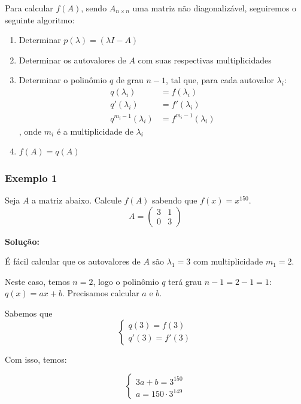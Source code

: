 \documentclass[12pt]{article}
\begin{document}
Para calcular $f(A)$, sendo $A_{n\times n}$ uma matriz não diagonalizável, seguiremos o seguinte algoritmo:
\begin{enumerate}
	\item Determinar $p(\lambda)=(\lambda I-A)$
	\item Determinar os autovalores de $A$ com suas respectivas multiplicidades
	\item Determinar o polinômio $q$ de grau $n-1$, tal que, para cada autovalor $\lambda_i$:
	\begin{align*}
		q(\lambda_i)&=f(\lambda_i)\\
		q'(\lambda_i)&=f'(\lambda_i)\\
		q^{m_i-1}(\lambda_i)&=f^{m_i-1}(\lambda_i)
	\end{align*}, onde $m_i$ é a multiplicidade de $\lambda_i$
	\item $f(A)=q(A)$
\end{enumerate}

\subsubsection{Exemplo 1}

Seja $A$ a matriz abaixo. Calcule $f(A)$ sabendo que $f(x)=x^{150}$.
\begin{equation*}
	A=\begin{pmatrix}
		3 & 1 \\
		0 & 3
	\end{pmatrix}
\end{equation*}

\textbf{Solução:}

É fácil calcular que os autovalores de $A$ são $\lambda_1=3$ com multiplicidade $m_1=2$.

Neste caso, temos $n=2$, logo o polinômio $q$ terá grau $n-1=2-1=1$: $q(x)=ax+b$. Precisamos calcular $a$ e $b$.

Sabemos que 
\begin{equation*}
	\begin{cases}
		q(3)=f(3)\\q'(3)=f'(3)
	\end{cases}
\end{equation*}

Com isso, temos:

\begin{equation*}
	\begin{cases}
		3a+b=3^{150}\\a=150\cdot 3^{149}
	\end{cases}
\end{equation*}
\end{document}
